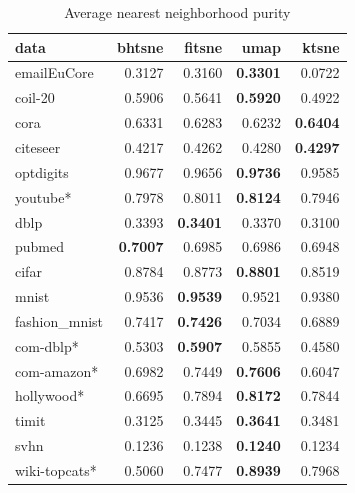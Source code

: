 \begin{table}[tb]
  \centering
\begin{subtable}{\linewidth}
  \centering
  \begin{tabular}{lrrrr}
    \toprule
data & bhtsne & fitsne & umap & ktsne \\ \midrule
emailEuCore & \num{0.3127} & \num{0.3160} & \bfseries \num{0.3301} & \num{0.0722} \\
coil-20 & \num{0.5906} & \num{0.5641} & \bfseries \num{0.5920} & \num{0.4922} \\
cora & \num{0.6331} & \num{0.6283} & \num{0.6232} & \bfseries \num{0.6404} \\
citeseer & \num{0.4217} & \num{0.4262} & \num{0.4280} & \bfseries \num{0.4297} \\
optdigits & \num{0.9677} & \num{0.9656} & \bfseries \num{0.9736} & \num{0.9585} \\
youtube* & \num{0.7978} & \num{0.8011} & \bfseries \num{0.8124} & \num{0.7946} \\
dblp & \num{0.3393} & \bfseries \num{0.3401} & \num{0.3370} & \num{0.3100} \\
pubmed & \bfseries \num{0.7007} & \num{0.6985} & \num{0.6986} & \num{0.6948} \\
cifar & \num{0.8784} & \num{0.8773} & \bfseries \num{0.8801} & \num{0.8519} \\
mnist & \num{0.9536} & \bfseries \num{0.9539} & \num{0.9521} & \num{0.9380} \\
fashion\_mnist & \num{0.7417} & \bfseries \num{0.7426} & \num{0.7034} & \num{0.6889} \\
com-dblp* & \num{0.5303} & \bfseries \num{0.5907} & \num{0.5855} & \num{0.4580} \\
com-amazon* & \num{0.6982} & \num{0.7449} & \bfseries \num{0.7606} & \num{0.6047} \\
hollywood* & \num{0.6695} & \num{0.7894} & \bfseries \num{0.8172} & \num{0.7844} \\
timit & \num{0.3125} & \num{0.3445} & \bfseries \num{0.3641} & \num{0.3481} \\
svhn & \num{0.1236} & \num{0.1238} & \bfseries \num{0.1240} & \num{0.1234} \\
wiki-topcats* & \num{0.5060} & \num{0.7477} & \bfseries \num{0.8939} & \num{0.7968} \\
\bottomrule
  \end{tabular}
  \caption{Average nearest neighborhood purity}
\end{subtable}
\par\bigskip

\end{table}
